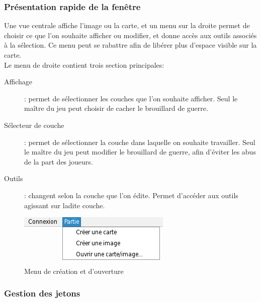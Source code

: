 \subsubsection{Présentation rapide de la fenêtre}

Une vue centrale affiche l'image ou la carte, et un menu sur la droite  permet de choisir ce que l'on souhaite afficher ou modifier, et donne accès aux outils associés à la sélection. Ce menu peut se rabattre afin de libérer plus d'espace visible sur la carte.\\
Le menu de droite contient trois section principales:
\begin{description}
	\item[Affichage]: permet de sélectionner les couches que l'on souhaite afficher. Seul le maître du jeu peut choisir de cacher le brouillard de guerre.
	\item[Sélecteur de couche]: permet de sélectionner la couche dans laquelle on souhaite travailler. Seul le maître du jeu peut modifier le brouillard de guerre, afin d'éviter les abus de la part des joueurs.
	\item[Outils]: changent selon la couche que l'on édite. Permet d'accéder aux outils agissant sur ladite couche.
\end{description}


\begin{figure}[h!]
	\centering
	\includegraphics[scale=0.9]{img/create_map_menu.png}
	\caption{Menu de création et d'ouverture}
    \label{fig:createmapmenu}
\end{figure}



\subsubsection{Gestion des jetons}

